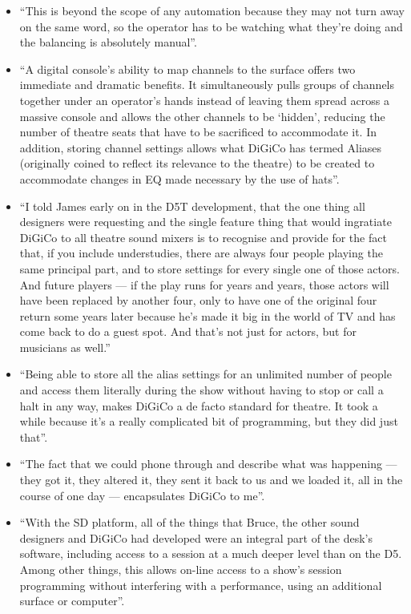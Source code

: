 \documentclass[12pt]{article}
\begin{document}
\begin{itemize}
            \item ``This is beyond the scope of any automation because they may not turn away on the same word, so the operator has to be watching what they're doing and the balancing is absolutely manual''.
            \item ``A digital console's ability to map channels to the surface offers two immediate and dramatic benefits. It simultaneously pulls groups of channels together under an operator's hands instead of leaving them spread across a massive console and allows the other channels to be `hidden', reducing the number of theatre seats that have to be sacrificed to accommodate it. In addition, storing channel settings allows what DiGiCo has termed Aliases (originally coined to reflect its relevance to the theatre) to be created to accommodate changes in EQ made necessary by the use of hats''.
            \item ``I told James early on in the D5T development, that the one thing all designers were requesting and the single feature thing that would ingratiate DiGiCo to all theatre sound mixers is to recognise and provide for the fact that, if you include understudies, there are always four people playing the same principal part, and to store settings for every single one of those actors. And future players --- if the play runs for years and years, those actors will have been replaced by another four, only to have one of the original four return some years later because he's made it big in the world of TV and has come back to do a guest spot. And that's not just for actors, but for musicians as well.''
            \item ``Being able to store all the alias settings for an unlimited number of people and access them literally during the show without having to stop or call a halt in any way, makes DiGiCo a de facto standard for theatre. It took a while because it's a really complicated bit of programming, but they did just that''.
            \item ``The fact that we could phone through and describe what was happening --- they got it, they altered it, they sent it back to us and we loaded it, all in the course of one day --- encapsulates DiGiCo to me''.
            \item ``With the SD platform, all of the things that Bruce, the other sound designers and DiGiCo had developed were an integral part of the desk's software, including access to a session at a much deeper level than on the D5. Among other things, this allows on-line access to a show's session programming without interfering with a performance, using an additional surface or computer''.
        \end{itemize}
    \newpage
\end{document}
